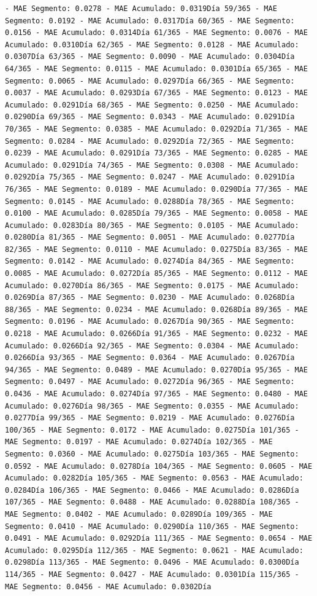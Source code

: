 \documentclass[
]{book}
\begin{document}
\begin{verbatim}
- MAE Segmento: 0.0278 - MAE Acumulado: 0.0319Día 59/365 - MAE Segmento: 0.0192 - MAE Acumulado: 0.0317Día 60/365 - MAE Segmento: 0.0156 - MAE Acumulado: 0.0314Día 61/365 - MAE Segmento: 0.0076 - MAE Acumulado: 0.0310Día 62/365 - MAE Segmento: 0.0128 - MAE Acumulado: 0.0307Día 63/365 - MAE Segmento: 0.0090 - MAE Acumulado: 0.0304Día 64/365 - MAE Segmento: 0.0115 - MAE Acumulado: 0.0301Día 65/365 - MAE Segmento: 0.0065 - MAE Acumulado: 0.0297Día 66/365 - MAE Segmento: 0.0037 - MAE Acumulado: 0.0293Día 67/365 - MAE Segmento: 0.0123 - MAE Acumulado: 0.0291Día 68/365 - MAE Segmento: 0.0250 - MAE Acumulado: 0.0290Día 69/365 - MAE Segmento: 0.0343 - MAE Acumulado: 0.0291Día 70/365 - MAE Segmento: 0.0385 - MAE Acumulado: 0.0292Día 71/365 - MAE Segmento: 0.0284 - MAE Acumulado: 0.0292Día 72/365 - MAE Segmento: 0.0239 - MAE Acumulado: 0.0291Día 73/365 - MAE Segmento: 0.0285 - MAE Acumulado: 0.0291Día 74/365 - MAE Segmento: 0.0308 - MAE Acumulado: 0.0292Día 75/365 - MAE Segmento: 0.0247 - MAE Acumulado: 0.0291Día 76/365 - MAE Segmento: 0.0189 - MAE Acumulado: 0.0290Día 77/365 - MAE Segmento: 0.0145 - MAE Acumulado: 0.0288Día 78/365 - MAE Segmento: 0.0100 - MAE Acumulado: 0.0285Día 79/365 - MAE Segmento: 0.0058 - MAE Acumulado: 0.0283Día 80/365 - MAE Segmento: 0.0105 - MAE Acumulado: 0.0280Día 81/365 - MAE Segmento: 0.0051 - MAE Acumulado: 0.0277Día 82/365 - MAE Segmento: 0.0110 - MAE Acumulado: 0.0275Día 83/365 - MAE Segmento: 0.0142 - MAE Acumulado: 0.0274Día 84/365 - MAE Segmento: 0.0085 - MAE Acumulado: 0.0272Día 85/365 - MAE Segmento: 0.0112 - MAE Acumulado: 0.0270Día 86/365 - MAE Segmento: 0.0175 - MAE Acumulado: 0.0269Día 87/365 - MAE Segmento: 0.0230 - MAE Acumulado: 0.0268Día 88/365 - MAE Segmento: 0.0234 - MAE Acumulado: 0.0268Día 89/365 - MAE Segmento: 0.0196 - MAE Acumulado: 0.0267Día 90/365 - MAE Segmento: 0.0218 - MAE Acumulado: 0.0266Día 91/365 - MAE Segmento: 0.0232 - MAE Acumulado: 0.0266Día 92/365 - MAE Segmento: 0.0304 - MAE Acumulado: 0.0266Día 93/365 - MAE Segmento: 0.0364 - MAE Acumulado: 0.0267Día 94/365 - MAE Segmento: 0.0489 - MAE Acumulado: 0.0270Día 95/365 - MAE Segmento: 0.0497 - MAE Acumulado: 0.0272Día 96/365 - MAE Segmento: 0.0436 - MAE Acumulado: 0.0274Día 97/365 - MAE Segmento: 0.0480 - MAE Acumulado: 0.0276Día 98/365 - MAE Segmento: 0.0355 - MAE Acumulado: 0.0277Día 99/365 - MAE Segmento: 0.0219 - MAE Acumulado: 0.0276Día 100/365 - MAE Segmento: 0.0172 - MAE Acumulado: 0.0275Día 101/365 - MAE Segmento: 0.0197 - MAE Acumulado: 0.0274Día 102/365 - MAE Segmento: 0.0360 - MAE Acumulado: 0.0275Día 103/365 - MAE Segmento: 0.0592 - MAE Acumulado: 0.0278Día 104/365 - MAE Segmento: 0.0605 - MAE Acumulado: 0.0282Día 105/365 - MAE Segmento: 0.0563 - MAE Acumulado: 0.0284Día 106/365 - MAE Segmento: 0.0466 - MAE Acumulado: 0.0286Día 107/365 - MAE Segmento: 0.0488 - MAE Acumulado: 0.0288Día 108/365 - MAE Segmento: 0.0402 - MAE Acumulado: 0.0289Día 109/365 - MAE Segmento: 0.0410 - MAE Acumulado: 0.0290Día 110/365 - MAE Segmento: 0.0491 - MAE Acumulado: 0.0292Día 111/365 - MAE Segmento: 0.0654 - MAE Acumulado: 0.0295Día 112/365 - MAE Segmento: 0.0621 - MAE Acumulado: 0.0298Día 113/365 - MAE Segmento: 0.0496 - MAE Acumulado: 0.0300Día 114/365 - MAE Segmento: 0.0427 - MAE Acumulado: 0.0301Día 115/365 - MAE Segmento: 0.0456 - MAE Acumulado: 0.0302Día 
\end{verbatim}
\end{document}
